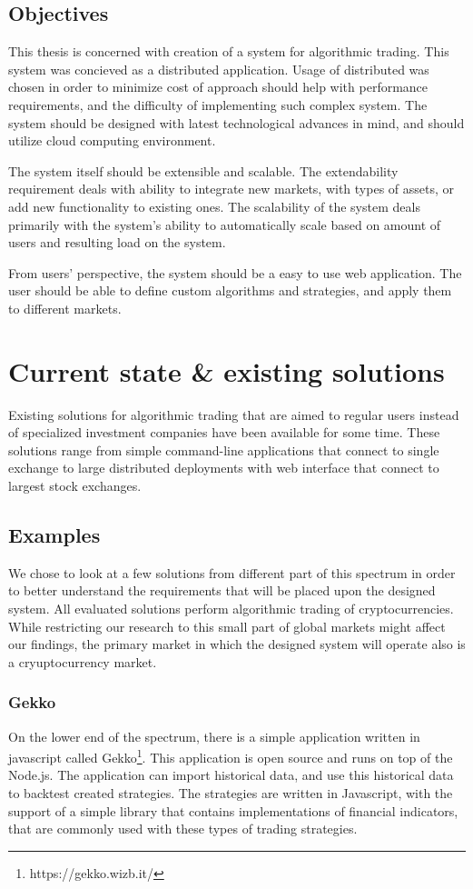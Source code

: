 \section{Objectives}
This thesis is concerned with creation of a system for algorithmic trading. This system was concieved
as a distributed application. Usage of distributed was chosen in order to minimize cost of
approach should help with performance requirements,
and the difficulty of implementing such complex system. The system should be designed with latest technological advances in mind, and
should utilize cloud computing environment.

The system itself should be extensible and scalable. The extendability requirement deals with ability to integrate new markets,
with types of assets, or add new functionality to existing ones. The scalability of the system deals primarily with the system's
ability to automatically scale based on amount of users and resulting load on the system.

From users' perspective, the system should be a easy to use web application. The user should be able to define custom
algorithms and strategies, and apply them to different markets.

\chapter{Current state \& existing solutions}
\label{chapter:current_state}
Existing solutions for algorithmic trading that are aimed to regular users instead of specialized investment companies
have been available for some time. These solutions range from simple command-line applications that connect to single exchange
to large distributed deployments with web interface that connect to largest stock exchanges\cite{Agopyan_financialbusiness}.

\section{Examples}
We chose to look at a few solutions from different part of this spectrum in order to better understand the requirements
that will be placed upon the designed system. All evaluated solutions perform algorithmic trading of cryptocurrencies.
While restricting our research to this small part of global markets might affect our findings, the primary
market in which the designed system will operate also is a cryuptocurrency market.

\subsection{Gekko}
On the lower end of the spectrum, there is a simple application written in javascript called Gekko\footnote{https://gekko.wizb.it/}.
This application is open source and runs on top of the Node.js. The application can import historical data,
and use this historical data to backtest created strategies. The strategies are written in Javascript, with the support
of a simple library that contains implementations of financial indicators, that are commonly used with these types
of trading strategies.

